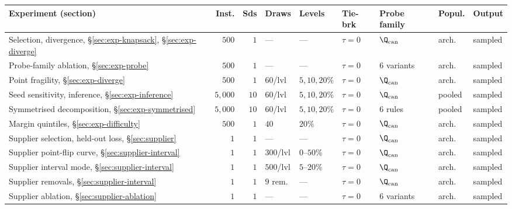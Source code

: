 \scriptsize
\setlength{\tabcolsep}{2.4pt}
\begin{tabular}{@{}P{2.6cm}rrP{1.15cm}P{1.5cm}P{1.05cm}P{1.6cm}P{1.15cm}P{1.2cm}@{}}
\toprule
Experiment (section) & Inst. & Sds & Draws & Levels & Tie-brk & Probe family & Popul. & Output\\
\midrule
Selection, divergence, \S\ref{sec:exp-knapsack}, \S\ref{sec:exp-diverge}
 & $500$ & $1$ & --- & --- & $\tau=0$ & $\Q_{\mathrm{can}}$ & arch. & sampled\\
\addlinespace[1pt]
Probe-family ablation, \S\ref{sec:exp-probe}
 & $500$ & $1$ & --- & --- & $\tau=0$ & $6$ variants & arch. & sampled\\
\addlinespace[1pt]
Point fragility, \S\ref{sec:exp-diverge}
 & $500$ & $1$ & $60$/lvl & $5,10,20\%$ & $\tau=0$ & $\Q_{\mathrm{can}}$ & arch. & sampled\\
\addlinespace[1pt]
Seed sensitivity, inference, \S\ref{sec:exp-inference}
 & $5{,}000$ & $10$ & $60$/lvl & $5,10,20\%$ & $\tau=0$ & $\Q_{\mathrm{can}}$ & pooled & sampled\\
\addlinespace[1pt]
Symmetrised decomposition, \S\ref{sec:exp-symmetrised}
 & $5{,}000$ & $10$ & $60$/lvl & $5,10,20\%$ & $\tau=0$ & $6$ rules & pooled & sampled\\
\addlinespace[1pt]
Margin quintiles, \S\ref{sec:exp-difficulty}
 & $500$ & $1$ & $40$ & $20\%$ & $\tau=0$ & $\Q_{\mathrm{can}}$ & arch. & sampled\\
\midrule
Supplier selection, held-out loss, \S\ref{sec:supplier}
 & $1$ & $1$ & --- & --- & $\tau=0$ & $\Q_{\mathrm{can}}$ & arch. & sampled\\
\addlinespace[1pt]
Supplier point-flip curve, \S\ref{sec:supplier-interval}
 & $1$ & $1$ & $300$/lvl & $0$--$50\%$ & $\tau=0$ & $\Q_{\mathrm{can}}$ & arch. & sampled\\
\addlinespace[1pt]
Supplier interval mode, \S\ref{sec:supplier-interval}
 & $1$ & $1$ & $500$/lvl & $5$--$20\%$ & $\tau=0$ & $\Q_{\mathrm{can}}$ & arch. & sampled\\
\addlinespace[1pt]
Supplier removals, \S\ref{sec:supplier-interval}
 & $1$ & $1$ & $9$ rem. & --- & $\tau=0$ & $\Q_{\mathrm{can}}$ & arch. & sampled\\
\addlinespace[1pt]
Supplier ablation, \S\ref{sec:supplier-ablation}
 & $1$ & $1$ & --- & --- & $\tau=0$ & $6$ variants & arch. & sampled\\

\end{tabular}
